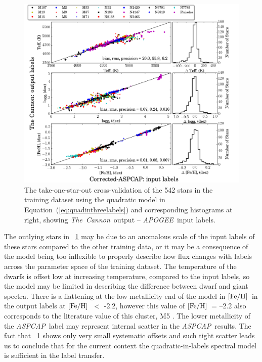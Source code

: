 \documentclass[12pt, preprint]{aastex}
\newcommand{\tc}{\textsl{The~Cannon}}
\newcommand{\apogee}{\textsl{APOGEE}}
\newcommand{\aspcap}{\textsl{ASPCAP}}
\newcommand{\feh}{\mbox{$\rm [Fe/H]$}}
\begin{document}
\begin{figure}[h!]
\centering
    \includegraphics[scale=0.45]{./plots/aftersubmit/fig4.png}
\caption{The take-one-star-out cross-validation of the 542 stars in the training dataset using the quadratic model in Equation~(\ref{eq:quadinthreelabels}) and corresponding histograms at right, showing \tc\ output -- \apogee\ input labels.}
\label{fig:takeonestarout}
\end{figure}


The outlying stars in \figurename~\ref{fig:takeonestarout} may be due to an anomalous scale of the input labels of these stars compared to the other training data, or it may be a consequence of the model being too inflexible to properly describe how flux changes with labels across the parameter space of the training dataset. 
The temperature of the dwarfs is offset low at increasing temperature, compared to the input labels, so the model may be limited in describing the difference between dwarf and giant spectra. 
There is a flattening at the low metallicity end of the model in \feh\ in the output labels at \feh\ $<$ -2.2, however this value of \feh\ = --2.2 also corresponds to the literature value of this cluster, M5 \citep{Meszaros2013}. 
The lower metallicity of the \aspcap\ label may represent internal scatter in the \aspcap\ results.
The fact that \figurename~\ref{fig:takeonestarout} shows only very small systematic offsets and such tight scatter leads us to conclude that for the
current context the quadratic-in-labels spectral model is sufficient in the label transfer. 
\end{document}
